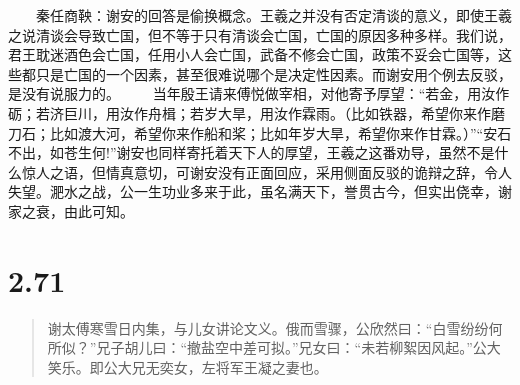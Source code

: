\documentclass[]{book}
\begin{document}
　　秦任商鞅：谢安的回答是偷换概念。王羲之并没有否定清谈的意义，即使王羲之说清谈会导致亡国，但不等于只有清谈会亡国，亡国的原因多种多样。我们说，君王耽迷酒色会亡国，任用小人会亡国，武备不修会亡国，政策不妥会亡国等，这些都只是亡国的一个因素，甚至很难说哪个是决定性因素。而谢安用个例去反驳，是没有说服力的。
　　当年殷王请来傅悦做宰相，对他寄予厚望：``若金，用汝作砺；若济巨川，用汝作舟楫；若岁大旱，用汝作霖雨。（比如铁器，希望你来作磨刀石；比如渡大河，希望你来作船和桨；比如年岁大旱，希望你来作甘霖。）''``安石不出，如苍生何!''谢安也同样寄托着天下人的厚望，王羲之这番劝导，虽然不是什么惊人之语，但情真意切，可谢安没有正面回应，采用侧面反驳的诡辩之辞，令人失望。淝水之战，公一生功业多来于此，虽名满天下，誉贯古今，但实出侥幸，谢家之衰，由此可知。

\section{2.71}\label{section-117}

\begin{quote}
谢太傅寒雪日内集，与儿女讲论文义。俄而雪骤，公欣然曰：``白雪纷纷何所似？''兄子胡儿曰：``撤盐空中差可拟。''兄女曰：``未若柳絮因风起。''公大笑乐。即公大兄无奕女，左将军王凝之妻也。
\end{quote}
\end{document}

